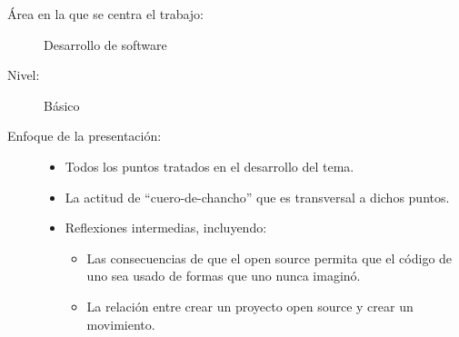 \begin{description}
 \item[Área en la que se centra el trabajo:] Desarrollo de software
 \item[Nivel:] Básico
 \item[Enfoque de la presentación:]
  \begin{itemize}
   \item Todos los puntos tratados en el desarrollo del tema.
   \item La actitud de ``cuero-de-chancho'' que es transversal a dichos puntos.
   \item Reflexiones intermedias, incluyendo:
     \begin{itemize}
     \item Las consecuencias de que el open source permita que el código de uno
       sea usado de formas que uno nunca imaginó.
     \item La relación entre crear un proyecto open source y crear un movimiento.
     \end{itemize}
  \end{itemize}
\end{description}
